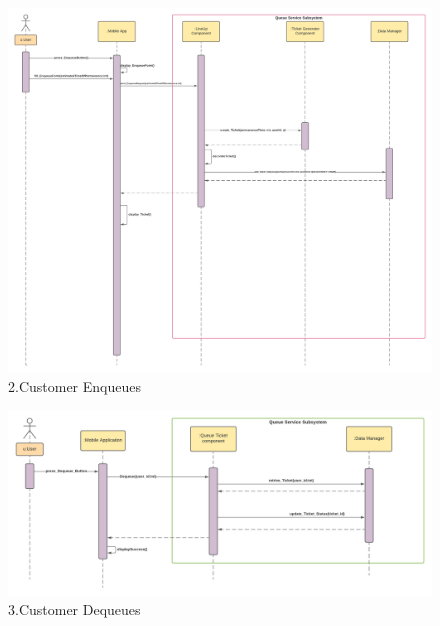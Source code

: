 \begin{figure}[h!]
    \centering
    \includegraphics[width=1\textwidth]{Images/runtimeViewDD/RunTimeViewUserEnqueue.png}
    \caption{\label{fig:RunTimeViewUserEnqueue}{2.Customer Enqueues}}
\end{figure}

\begin{figure}[h!]
    \centering
    \includegraphics[width=1\textwidth]{Images/runtimeViewDD/RunTimeViewDequeue.png}
    \caption{\label{fig:RunTimeViewDequeue}{3.Customer Dequeues}}
\end{figure}

